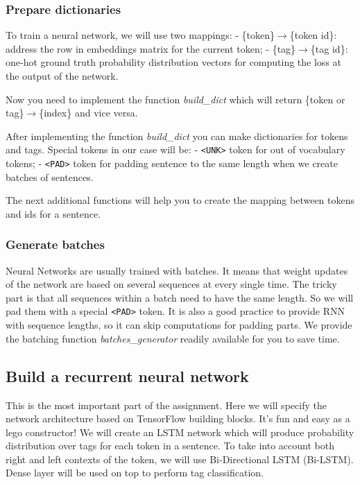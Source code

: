 \documentclass[11pt]{article}
\begin{document}
    \hypertarget{prepare-dictionaries}{%
\subsubsection{Prepare dictionaries}\label{prepare-dictionaries}}

To train a neural network, we will use two mappings: -
\{token\}\(\to\)\{token id\}: address the row in embeddings matrix for
the current token; - \{tag\}\(\to\)\{tag id\}: one-hot ground truth
probability distribution vectors for computing the loss at the output of
the network.

Now you need to implement the function \emph{build\_dict} which will
return \{token or tag\}\(\to\)\{index\} and vice versa.

    After implementing the function \emph{build\_dict} you can make
dictionaries for tokens and tags. Special tokens in our case will be: -
\texttt{\textless{}UNK\textgreater{}} token for out of vocabulary
tokens; - \texttt{\textless{}PAD\textgreater{}} token for padding
sentence to the same length when we create batches of sentences.

    The next additional functions will help you to create the mapping
between tokens and ids for a sentence.

    \hypertarget{generate-batches}{%
\subsubsection{Generate batches}\label{generate-batches}}

Neural Networks are usually trained with batches. It means that weight
updates of the network are based on several sequences at every single
time. The tricky part is that all sequences within a batch need to have
the same length. So we will pad them with a special
\texttt{\textless{}PAD\textgreater{}} token. It is also a good practice
to provide RNN with sequence lengths, so it can skip computations for
padding parts. We provide the batching function
\emph{batches\_generator} readily available for you to save time.

    \hypertarget{build-a-recurrent-neural-network}{%
\subsection{Build a recurrent neural
network}\label{build-a-recurrent-neural-network}}

This is the most important part of the assignment. Here we will specify
the network architecture based on TensorFlow building blocks. It's fun
and easy as a lego constructor! We will create an LSTM network which
will produce probability distribution over tags for each token in a
sentence. To take into account both right and left contexts of the
token, we will use Bi-Directional LSTM (Bi-LSTM). Dense layer will be
used on top to perform tag classification.
\end{document}
